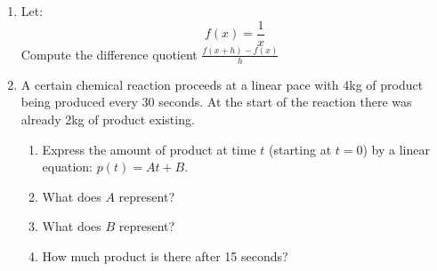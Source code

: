 \documentclass[letterpaper,12pt,fleqn]{article}
\begin{document}
\begin{enumerate}
\bigskip

\item Let:
\[f(x)=\frac{1}{x}\]
Compute the difference quotient $\frac{f(x+h)-f(x)}{h}$

\bigskip

\item A certain chemical reaction proceeds at a linear pace with 4kg of product
being produced every 30 seconds. At the start of the reaction there was already
2kg of product existing.
\begin{enumerate}
\item Express the amount of product at time $t$ (starting at $t=0$) by a linear
equation: $p(t)=At+B$.
\item What does $A$ represent?
\item What does $B$ represent?
\item How much product is there after 15 seconds?
\end{enumerate}

\end{enumerate}
\end{document}
